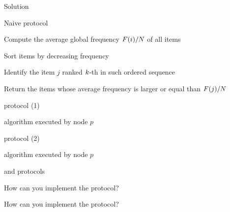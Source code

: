 \begin{frame}{Solution}
	
\begin{block}{Naive protocol}
\BI
\item Compute the \alert{average global frequency} $F(i)/N$ of all items
\item Sort items by decreasing frequency
\item Identify the item $j$ ranked $k$-th in such ordered sequence
\item Return the items whose average frequency is larger or equal
than $F(j)/N$
\EI
\end{block}
	
\end{frame}

\begin{frame}{\FreqMF protocol (1)}
	\begin{Procedure}

\caption{\FreqMF algorithm executed by node $p$}

\BlankLine
{}
\BlankLine
{}
\end{Procedure}

\end{frame}

\begin{frame}{\FreqMF protocol (2)}
	\begin{Procedure}

\caption{\FreqMF algorithm executed by node $p$}

\BlankLine
{}
\end{Procedure}

\end{frame}

\begin{frame}{\FreqAF and \FreqRF protocols}
	
\BI
\item How can you implement the \FreqAF protocol?
\item How can you implement the \FreqRF protocol?
\EI

\end{frame}


